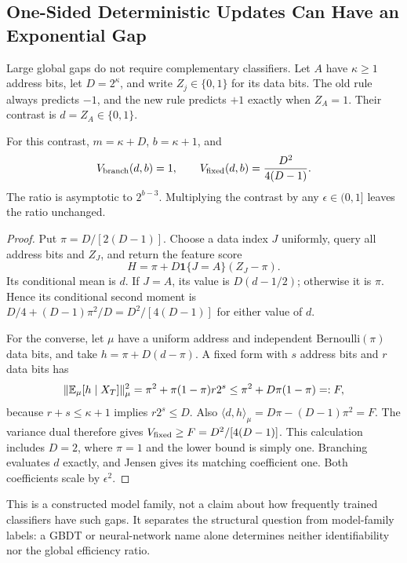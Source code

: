 \subsection{One-Sided Deterministic Updates Can Have an Exponential Gap}
\label{app:indicatoraddress}
Large global gaps do not require complementary classifiers. Let $A$ have
$\kappa\ge1$ address bits, let $D=2^\kappa$, and write $Z_j\in\{0,1\}$
for its data bits. The old rule always predicts $-1$, and the new rule
predicts $+1$ exactly when $Z_A=1$. Their contrast is $d=Z_A\in\{0,1\}$.
\begin{proposition}\label{prop:indicatoraddress}
For this contrast, $m=\kappa+D$, $b=\kappa+1$, and
\[
 V_{\rm branch}(d,b)=1,\qquad
 V_{\rm fixed}(d,b)=\frac{D^2}{4(D-1)}.
\]
The ratio is asymptotic to $2^{b-3}$. Multiplying the contrast by any
$\epsilon\in(0,1]$ leaves the ratio unchanged.
\end{proposition}
\begin{proof}
Put $\pi=D/[2(D-1)]$. Choose a data index $J$ uniformly, query all address
bits and $Z_J$, and return the feature score
\[
 H=\pi+D\mathbf1\{J=A\}(Z_J-\pi).
\]
Its conditional mean is $d$. If $J=A$, its value is $D(d-1/2)$; otherwise
it is $\pi$. Hence its conditional second moment is
$D/4+(D-1)\pi^2/D=D^2/[4(D-1)]$ for either value of $d$.

For the converse, let $\mu$ have a uniform address and independent
Bernoulli$(\pi)$ data bits, and take $h=\pi+D(d-\pi)$.
A fixed form with $s$ address bits and $r$ data bits has
\[
 \|\mathbb{E}_\mu[h\mid X_T]\|_\mu^2
 =\pi^2+\pi(1-\pi)r2^s
 \le\pi^2+D\pi(1-\pi)=:F,
\]
because $r+s\le\kappa+1$ implies $r2^s\le D$.
Also $\langle d,h\rangle_\mu=D\pi-(D-1)\pi^2=F$.
The variance dual therefore gives $V_{\rm fixed}\ge F=D^2/[4(D-1)]$.
This calculation includes $D=2$, where $\pi=1$ and the lower bound is
simply one. Branching evaluates $d$ exactly, and Jensen gives its matching
coefficient one. Both coefficients scale by $\epsilon^2$.
\end{proof}

This is a constructed model family, not a claim about how frequently
trained classifiers have such gaps. It separates the structural question
from model-family labels: a GBDT or neural-network name alone determines
neither identifiability nor the global efficiency ratio.
